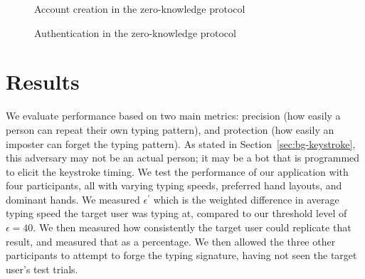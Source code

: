 \documentclass[11pt]{article}
\begin{document}
\begin{figure}
\centering
{}
\caption{Account creation in the zero-knowledge protocol}
\label{fig:zk_new}
\end{figure}

\begin{figure}
\centering
{}
\caption{Authentication in the zero-knowledge protocol}
\label{fig:zk_auth}
\end{figure}
\newpage
\section{Results}
\label{sec:results}
We evaluate performance based on two main metrics: precision (how easily a person can repeat their own typing pattern), and protection (how easily an imposter can forget the typing pattern). As stated in Section~\ref{sec:bg-keystroke}, this adversary may not be an actual person; it may be a bot that is programmed to elicit the keystroke timing.  We test the performance of our application with four participants, all with varying typing speeds, preferred hand layouts, and dominant hands.  We measured $\epsilon^{'}$ which is the weighted difference in average typing speed the target user was typing at, compared to our threshold level of $\epsilon=40$. We then measured how consistently the target user could replicate that result, and measured that as a percentage. We then allowed the three other participants to attempt to forge the typing signature, having not seen the target user's test trials.
\end{document}

